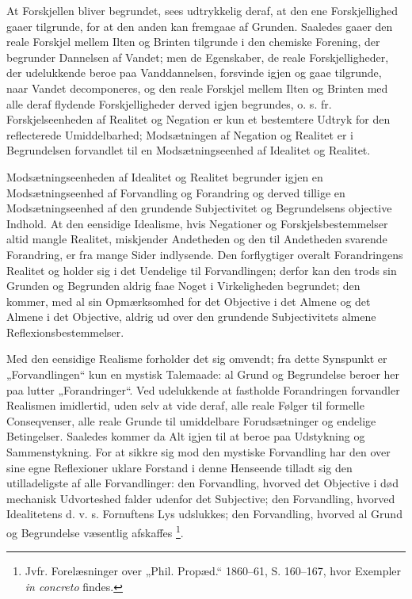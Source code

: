 \documentclass[11pt]{book}
\newcommand{\opage}[1]{\marginnote{\footnotesize\textit{[#1]}}}
\begin{document}
At Forskjellen bliver begrundet, sees udtrykkelig deraf, at den ene
Forskjellighed gaaer tilgrunde, for at den anden kan fremgaae af
Grunden. Saaledes gaaer den reale Forskjel mellem Ilten og Brinten
tilgrunde i den chemiske Forening, der begrunder Dannelsen af
Vandet; men de Egenskaber, de reale Forskjelligheder, der
udelukkende beroe paa Vanddannelsen, forsvinde igjen og gaae
tilgrunde, naar Vandet decomponeres, og den reale Forskjel mellem
Ilten og Brinten med alle deraf flydende Forskjelligheder derved
igjen begrundes, o. s. fr. Forskjelseenheden af Realitet og
Negation er kun et bestemtere Udtryk for den reflecterede
Umiddelbarhed; Modsætningen af Negation og Realitet er i
Begrundelsen forvandlet til en Modsætningseenhed af Idealitet og
Realitet.

Modsætningseenheden af Idealitet og Realitet begrunder igjen en
Modsætningseenhed af Forvandling og Forandring og derved tillige en
Modsætningseenhed af den grundende Subjectivitet og Begrundelsens
objective Indhold. At den eensidige Idealisme, hvis Negationer og
Forskjelsbestemmelser altid mangle Realitet, miskjender Andetheden
og den til Andetheden svarende Forandring, er fra mange Sider
indlysende. Den forflygtiger overalt Forandringens Realitet og
holder sig
\opage{99} \setcounter{footnote}{0}%
i det Uendelige til Forvandlingen; derfor kan den trods sin
Grunden og Begrunden aldrig faae Noget i Virkeligheden begrundet;
den kommer, med al sin Opmærksomhed for det Objective i det Almene
og det Almene i det Objective, aldrig ud over den grundende
Subjectivitets almene Reflexionsbestemmelser.

Med den eensidige Realisme forholder det sig omvendt; fra dette
Synspunkt er „Forvandlingen“ kun en mystisk Talemaade: al Grund og
Begrundelse beroer her paa lutter „Forandringer“. Ved udelukkende
at fastholde Forandringen forvandler Realismen imidlertid, uden
selv at vide deraf, alle reale Følger til formelle Conseqvenser,
alle reale Grunde til umiddelbare Forudsætninger og endelige
Betingelser. Saaledes kommer da Alt igjen til at beroe paa
Udstykning og Sammenstykning. For at sikkre sig mod den mystiske
Forvandling har den over sine egne Reflexioner uklare Forstand i
denne Henseende tilladt sig den utilladeligste af alle
Forvandlinger: den Forvandling, hvorved det Objective i død
mechanisk Udvorteshed falder udenfor det Subjective; den
Forvandling, hvorved Idealitetens d. v. s. Fornuftens Lys
udslukkes; den Forvandling, hvorved al Grund og Begrundelse
væsentlig afskaffes%
\footnote{Jvfr. Forelæsninger over „Phil. Propæd.“ 1860--61, S.
160--167, hvor Exempler \textit{in concreto} findes.}.
\end{document}
